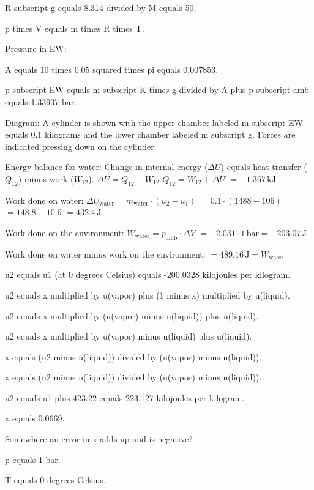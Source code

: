 R subscript g equals 8.314 divided by M equals 50.  

p times V equals m times R times T.  

Pressure in EW:  

A equals 10 times 0.05 squared times pi equals 0.007853.  

p subscript EW equals m subscript K times g divided by A plus p subscript amb equals 1.33937 bar.  

Diagram: A cylinder is shown with the upper chamber labeled m subscript EW equals 0.1 kilograms and the lower chamber labeled m subscript g. Forces are indicated pressing down on the cylinder.

Energy balance for water:  
Change in internal energy (\( \Delta U \)) equals heat transfer (\( Q_{12} \)) minus work (\( W_{12} \)).  
\( \Delta U = Q_{12} - W_{12} \)  
\( Q_{12} = W_{12} + \Delta U \)  
\( = -1.367 \, \text{kJ} \)  

Work done on water:  
\( \Delta U_{\text{water}} = m_{\text{water}} \cdot (u_2 - u_1) \)  
\( = 0.1 \cdot (1488 - 106) \)  
\( = 148.8 - 10.6 \)  
\( = 432.4 \, \text{J} \)  

Work done on the environment:  
\( W_{\text{water}} = p_{\text{amb}} \cdot \Delta V \)  
\( = -2.031 \cdot 1 \, \text{bar} = -203.07 \, \text{J} \)  

Work done on water minus work on the environment:  
\( = 489.16 \, \text{J} = W_{\text{water}} \)

u2 equals u1 (at 0 degrees Celsius) equals -200.0328 kilojoules per kilogram.  

u2 equals x multiplied by u(vapor) plus (1 minus x) multiplied by u(liquid).  

u2 equals x multiplied by (u(vapor) minus u(liquid)) plus u(liquid).  

u2 equals x multiplied by u(vapor) minus u(liquid) plus u(liquid).  

x equals (u2 minus u(liquid)) divided by (u(vapor) minus u(liquid)).  

x equals (u2 minus u(liquid)) divided by (u(vapor) minus u(liquid)).  

u2 equals u1 plus 423.22 equals 223.127 kilojoules per kilogram.  

x equals 0.0669.  

Somewhere an error in x adds up and is negative?  

p equals 1 bar.  

T equals 0 degrees Celsius.